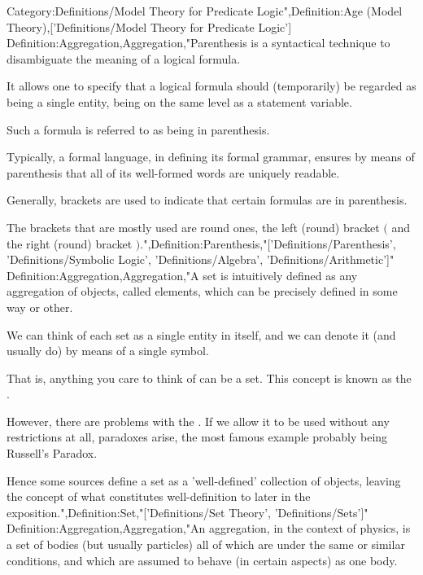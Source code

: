 Category:Definitions/Model Theory for Predicate Logic",Definition:Age (Model Theory),['Definitions/Model Theory for Predicate Logic']
Definition:Aggregation,Aggregation,"Parenthesis is a syntactical technique to disambiguate the meaning of a logical formula.

It allows one to specify that a logical formula should (temporarily) be regarded as being a single entity, being on the same level as a statement variable.

Such a formula is referred to as being in parenthesis.

Typically, a formal language, in defining its formal grammar, ensures by means of parenthesis that all of its well-formed words are uniquely readable.


Generally, brackets are used to indicate that certain formulas are in parenthesis.

The brackets that are mostly used are round ones, the left (round) bracket $($ and the right (round) bracket $)$.",Definition:Parenthesis,"['Definitions/Parenthesis', 'Definitions/Symbolic Logic', 'Definitions/Algebra', 'Definitions/Arithmetic']"
Definition:Aggregation,Aggregation,"A set is intuitively defined as any aggregation of objects, called elements, which can be precisely defined in some way or other.

We can think of each set as a single entity in itself, and we can denote it (and usually do) by means of a single symbol.


That is, anything you care to think of can be a set. This concept is known as the .


However, there are problems with the . If we allow it to be used without any restrictions at all, paradoxes arise, the most famous example probably being Russell's Paradox.


Hence some sources define a set as a  'well-defined' collection of objects, leaving the concept of what constitutes well-definition to later in the exposition.",Definition:Set,"['Definitions/Set Theory', 'Definitions/Sets']"
Definition:Aggregation,Aggregation,"An aggregation, in the context of physics, is a set of bodies (but usually particles) all of which are under the same or similar conditions, and which are assumed to behave (in certain aspects) as one body.

